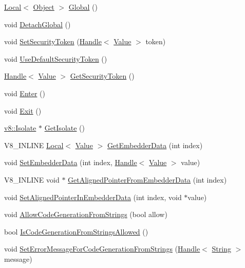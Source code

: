 \begin{DoxyCompactItemize}
\item 
\hyperlink{classv8_1_1_local}{Local}$<$ \hyperlink{classv8_1_1_object}{Object} $>$ \hyperlink{classv8_1_1_context_af5cd9f97ef6a3307c1c21f80f4b743eb}{Global} ()
\item 
void \hyperlink{classv8_1_1_context_a841c7dd92eb8c57df92a268a164dea97}{Detach\+Global} ()
\item 
void \hyperlink{classv8_1_1_context_a288d8549547f6bdf4312f5333f60f24d}{Set\+Security\+Token} (\hyperlink{classv8_1_1_handle}{Handle}$<$ \hyperlink{classv8_1_1_value}{Value} $>$ token)
\item 
void \hyperlink{classv8_1_1_context_aa9e1a14982b64fd51ab87600a287bad2}{Use\+Default\+Security\+Token} ()
\item 
\hyperlink{classv8_1_1_handle}{Handle}$<$ \hyperlink{classv8_1_1_value}{Value} $>$ \hyperlink{classv8_1_1_context_a8e71e658633518ca7718c0f6e938c6a9}{Get\+Security\+Token} ()
\item 
void \hyperlink{classv8_1_1_context_a6995c49d9897eb49053f07874b825133}{Enter} ()
\item 
void \hyperlink{classv8_1_1_context_a2db09d4fefb26023a40d88972a4c1599}{Exit} ()
\item 
\hyperlink{classv8_1_1_isolate}{v8\+::\+Isolate} $\ast$ \hyperlink{classv8_1_1_context_af55552d8658ecb20eff7af2c83e8ede2}{Get\+Isolate} ()
\item 
V8\+\_\+\+I\+N\+L\+I\+N\+E \hyperlink{classv8_1_1_local}{Local}$<$ \hyperlink{classv8_1_1_value}{Value} $>$ \hyperlink{classv8_1_1_context_a9cfafe0ac56f6aee17eb80a913489296}{Get\+Embedder\+Data} (int index)
\item 
void \hyperlink{classv8_1_1_context_ae18e007074770872e78e0040f36de8c6}{Set\+Embedder\+Data} (int index, \hyperlink{classv8_1_1_handle}{Handle}$<$ \hyperlink{classv8_1_1_value}{Value} $>$ value)
\item 
V8\+\_\+\+I\+N\+L\+I\+N\+E void $\ast$ \hyperlink{classv8_1_1_context_aa3b5c1a1a5d145c6096840898013f559}{Get\+Aligned\+Pointer\+From\+Embedder\+Data} (int index)
\item 
void \hyperlink{classv8_1_1_context_a522063c88e4c2832f5ff4f3980815f58}{Set\+Aligned\+Pointer\+In\+Embedder\+Data} (int index, void $\ast$value)
\item 
void \hyperlink{classv8_1_1_context_a794ccc42113566f5d363f89c8b0d3c2c}{Allow\+Code\+Generation\+From\+Strings} (bool allow)
\item 
bool \hyperlink{classv8_1_1_context_aa7a960a232d232d1a2a904c2e6c18831}{Is\+Code\+Generation\+From\+Strings\+Allowed} ()
\item 
void \hyperlink{classv8_1_1_context_a6a8d067b246b8792b19e8075bc410f1d}{Set\+Error\+Message\+For\+Code\+Generation\+From\+Strings} (\hyperlink{classv8_1_1_handle}{Handle}$<$ \hyperlink{classv8_1_1_string}{String} $>$ message)
\end{DoxyCompactItemize}
